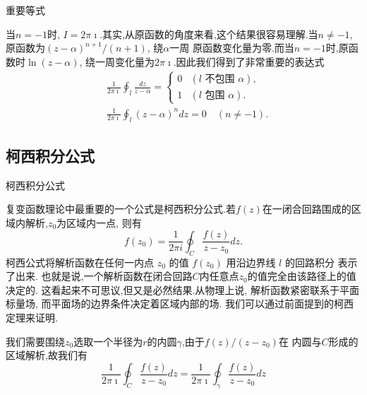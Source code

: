 \documentclass[fontset=windows, chinese, 10pt]{beamer}
\begin{document}
\begin{frame}{重要等式}
\small
\begin{solution}
当$n = -1$时, $I = 2\pi \imath$.其实,从原函数的角度来看,这个结果很容易理解.当$n\neq -1$,原函数为$(z-\alpha)^{n+1}/(n+1)$, 绕$\alpha$一周
原函数变化量为零.而当$n=-1$时,原函数时$\ln(z-\alpha)$, 绕一周变化量为$2\pi \imath$.因此我们得到了非常重要的表达式
$$
    \begin{aligned}
        & \frac{1}{2 \pi \imath} \oint_l \frac{d z}{z-\alpha}= \begin{cases}0 & (l \text { 不包围 } \alpha), \\
        1 & (l \text { 包围 } \alpha) . \end{cases} \\
        & \frac{1}{2 \pi \imath} \oint_l(z-\alpha)^n d z=0 \quad(n \neq-1) .
        \end{aligned}
$$
\end{solution}
\end{frame}

\subsection{柯西积分公式}

\label{subsec:cauchy_formula}
\begin{frame}{柯西积分公式}

复变函数理论中最重要的一个公式是柯西积分公式.若$f(z)$在一闭合回路围成的区域内解析,$z_0$为区域内一点,
则有
\begin{equation}
    f\left(z_0\right)=\frac{1}{2 \pi i} \oint_C \frac{f(z)}{z-z_0} d z .  
\end{equation}
柯西公式将解析函数在任何一内点 $z_0$ 的值 $f(z_0)$ 用沿边界线 $l$ 的回路积分 表示了出来.
也就是说,一个解析函数在闭合回路$C$内任意点$z_0$的值完全由该路径上的值决定的. 
这看起来不可思议,但又是必然结果.从物理上说, 解析函数紧密联系于平面标量场, 而平面场的边界条件决定着区域内部的场.
我们可以通过前面提到的柯西定理来证明.

我们需要围绕$z_0$选取一个半径为$r$的内圆$\gamma$,由于$f(z)/(z-z_0)$在
内圆与$C$形成的区域解析,故我们有
\[ \frac{1}{2 \pi \imath} \oint_C \frac{f(z)}{z-z_0} d z = \frac{1}{2 \pi \imath} \oint_\gamma \frac{f(z)}{z-z_0} d z
    \]

  \end{frame}
\end{document}
